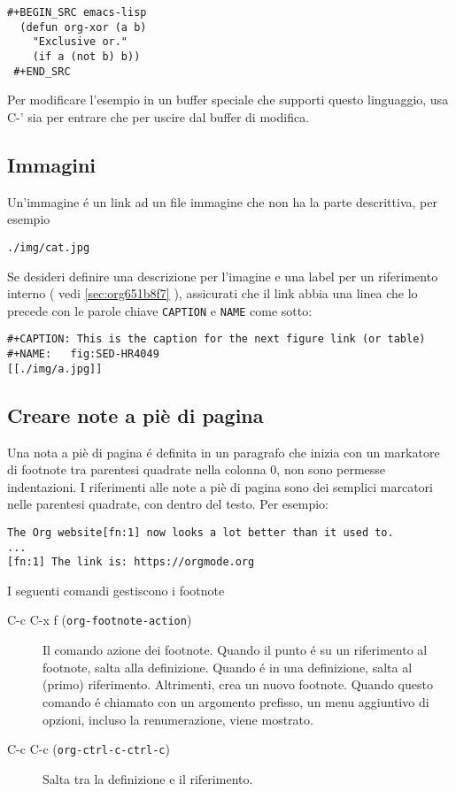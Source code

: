\documentclass[11pt]{article}
\begin{document}
\begin{verbatim}
#+BEGIN_SRC emacs-lisp
  (defun org-xor (a b)
    "Exclusive or."
    (if a (not b) b))
 #+END_SRC
\end{verbatim}

Per modificare l'esempio in un buffer speciale che supporti questo
linguaggio, usa C-' sia per entrare che per uscire dal
buffer di modifica.

\subsection{Immagini}
\label{sec:orgdde4c03}
Un'immagine é un link ad un file immagine che non ha la parte
descrittiva, per esempio

\begin{verbatim}
./img/cat.jpg
\end{verbatim}


Se desideri definire una descrizione per l'imagine e una label per un
riferimento interno ( vedi \ref{sec:org651b8f7} ), assicurati
che il link abbia una linea che lo precede con le parole chiave
\texttt{CAPTION} e \texttt{NAME} come sotto:

\begin{verbatim}
#+CAPTION: This is the caption for the next figure link (or table)
#+NAME:   fig:SED-HR4049
[[./img/a.jpg]]
\end{verbatim}

\subsection{Creare note a piè di pagina}
\label{sec:org41b63bd}
Una nota a piè di pagina é definita in un paragrafo che inizia con un
markatore di footnote tra parentesi quadrate nella colonna 0,
non sono permesse indentazioni. I riferimenti alle note a piè di
pagina sono dei semplici marcatori nelle parentesi quadrate, con
dentro del testo. Per esempio:

\begin{verbatim}
The Org website[fn:1] now looks a lot better than it used to.
...
[fn:1] The link is: https://orgmode.org
\end{verbatim}

I seguenti comandi gestiscono i footnote

\begin{description}
\item[{C-c C-x f (\texttt{org-footnote-action})}] Il comando azione dei footnote. Quando il punto é su un riferimento
al footnote, salta alla definizione. Quando é in una definizione,
salta al (primo) riferimento. Altrimenti, crea un nuovo
footnote. Quando questo comando é chiamato con un argomento
prefisso, un menu aggiuntivo di opzioni, incluso la renumerazione,
viene mostrato.

\item[{C-c C-c (\texttt{org-ctrl-c-ctrl-c})}] Salta tra la definizione e il riferimento.
\end{description}
\end{document}
